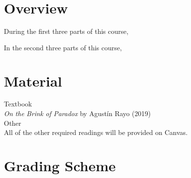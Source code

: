 \documentclass[letterpaper]{infinity_syllabus} %
\begin{document}

\makeprofile %

\section{Overview}

During the first three parts of this course, 

In the second three parts of this course, 

\vspace{0.5cm} %
\section{Material}

{\color{myCOLOR} Textbook}\\
\textit{On the Brink of Paradox} by Agust\'{i}n Rayo (2019)\\

{\color{myCOLOR} Other}\\
All of the other required readings will be provided on Canvas.

\vspace{0.5cm}
\section{Grading Scheme}

\begin{twentyshort}
\end{twentyshort}
\end{document}
